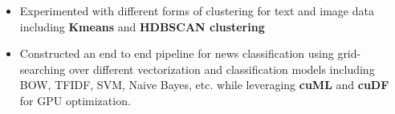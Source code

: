 \documentclass[letterpaper,11pt]{article}
\makeatletter
\newcommand{\resitem}[1]{\item #1 \vspace{-8pt}}
\newcommand{\ressubheadingsmol}[2]{\vspace{1pt}
\begin{tabular*}{7.0in}{l@{\cftdotfill{\cftsecdotsep}\extracolsep{\fill}}r}
		\textbf{#1} & \textit{#2} \\
\end{tabular*}\vspace{-6pt}}
\makeatother
\begin{document}
\begin{itemize}
    \resitem{Experimented with  different forms of clustering for text and image data including \textbf{Kmeans} and  \textbf{HDBSCAN clustering}}
    \resitem{Constructed an end to end pipeline for news classification using grid-searching over different vectorization and classification models including BOW, TFIDF, SVM, Naive Bayes, etc. while leveraging \textbf{cuML} and \textbf{cuDF} for GPU optimization.}
\end{itemize}

\end{document}

